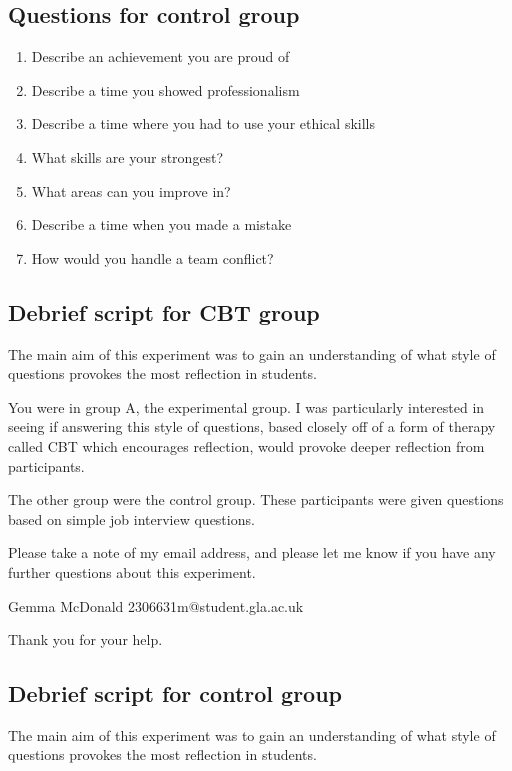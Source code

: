 \documentclass{l4proj}
\begin{document}
\begin{appendices}
\subsection{Questions for control group}

\begin{enumerate}
    \item Describe an achievement you are proud of
    \item Describe a time you showed professionalism
    \item Describe a time where you had to use your ethical skills
    \item What skills are your strongest?
    \item What areas can you improve in?
    \item Describe a time when you made a mistake
    \item How would you handle a team conflict?
\end{enumerate}

\subsection{Debrief script for CBT group}

The main aim of this experiment was to gain an understanding of what style of questions provokes the most reflection in students. 

You were in group A, the experimental group. I was particularly interested in seeing if answering this style of questions, based closely off of a form of therapy called CBT which encourages reflection, would provoke deeper reflection from participants. 

The other group were the control group. These participants were given questions based on simple job interview questions.

Please take a note of my email address, and please let me know if you have any further questions about this experiment.

Gemma McDonald
2306631m@student.gla.ac.uk

Thank you for your help.


\subsection{Debrief script for control group}

The main aim of this experiment was to gain an understanding of what style of questions provokes the most reflection in students. 


\end{appendices}
\end{document}
